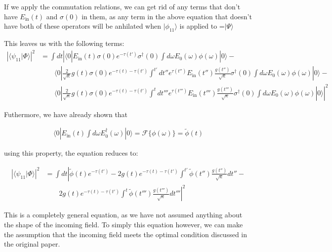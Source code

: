 \documentclass[12pt]{article}
\begin{document}
If we apply the commutation relations, we can get rid of any terms that don't have $E_\textrm{in}(t)$ and $\sigma(0)$ in them, as any term in the above equation that doesn't have both of these operators will be anhilated when $|\phi_{11} \rangle$ is applied to =$|\Psi\rangle$

This leaves us with the following terms:
\begin{align}
\left | \langle \psi_{11} | \Phi \rangle \right | ^2 &= \int dt \left | \langle 0 | E_\textrm{in}(t) \sigma(0) e^{-\tau(t')}
\sigma^\dagger(0) \int d\omega E_0(\omega) \phi(\omega) | 0 \rangle -\right. \\
&\qquad  \langle 0 | \frac{2}{\sqrt{\kappa}} g(t) \sigma(0) e^{-\tau(t) -\tau(t')}
\int^{t'} dt'' e^{\tau(t'')} E_\textrm{in}(t'')\frac{g(t'')}{\sqrt{\kappa}} \sigma^\dagger(0) \int d\omega E_0(\omega) \phi(\omega) | 0 \rangle - \\
& \qquad \left. \langle 0 | \frac{2}{\sqrt{\kappa}} g(t) \sigma(0) e^{-\tau(t) -\tau(t')}
\int^{t} dt''' e^{\tau(t''')} E_\textrm{in}(t''')\frac{g(t''')}{\sqrt{\kappa}} \sigma^\dagger(0) \int d\omega E_0(\omega) \phi(\omega) | 0 \rangle \right |^2
\end{align}

Futhermore, we have already shown that 

\begin{align}
\langle 0 |E_\textrm{in}(t) \int d\omega E^\dagger_0(\omega) | 0 \rangle= \mathscr{F}\{\phi(\omega)\} = \tilde{\phi}(t)
\end{align}

using this property, the equation reduces to:

\begin{align}
\left | \langle \psi_{11} | \Phi \rangle \right | ^2 &= \int dt\left| \tilde{\phi}(t)e^{-\tau(t')} -2 g(t) e^{-\tau(t)-\tau(t')} \int^{t'} \tilde{\phi}(t'')\frac{g(t'')}{\sqrt{\kappa}} dt'' - \right.\\
&\left. \qquad 2 g(t) e^{-\tau(t)-\tau(t')} \int^t \tilde{\phi}(t''')\frac{g(t''')}{\sqrt{\kappa}} dt''' \right |^2 
\end{align}

This is a completely general equation, as we have not assumed anything about the shape of the incoming field. 
To simply this equation however, we can make the assumption that the incoming field meets the optimal condition discussed
in the original paper.
\end{document}
